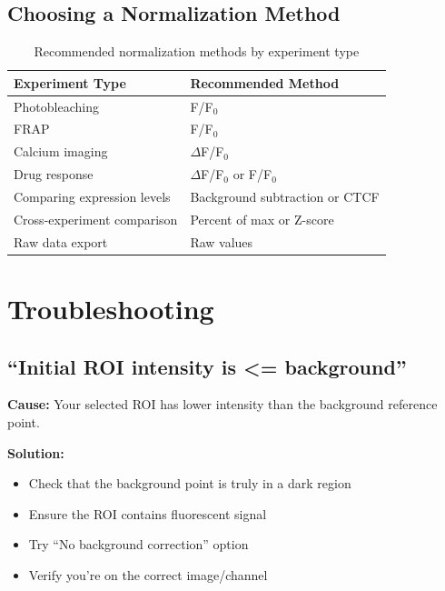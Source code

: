\documentclass[11pt,a4paper]{article}
\begin{document}
\subsection{Choosing a Normalization Method}

\begin{table}[h]
\centering
\begin{tabular}{@{}ll@{}}
\toprule
\textbf{Experiment Type} & \textbf{Recommended Method} \\
\midrule
Photobleaching & F/F$_0$ \\
FRAP & F/F$_0$ \\
Calcium imaging & $\Delta$F/F$_0$ \\
Drug response & $\Delta$F/F$_0$ or F/F$_0$ \\
Comparing expression levels & Background subtraction or CTCF \\
Cross-experiment comparison & Percent of max or Z-score \\
Raw data export & Raw values \\
\bottomrule
\end{tabular}
\caption{Recommended normalization methods by experiment type}
\end{table}

\section{Troubleshooting}

\subsection{``Initial ROI intensity is <= background''}

\textbf{Cause:} Your selected ROI has lower intensity than the background reference point.

\textbf{Solution:}
\begin{itemize}
    \item Check that the background point is truly in a dark region
    \item Ensure the ROI contains fluorescent signal
    \item Try ``No background correction'' option
    \item Verify you're on the correct image/channel
\end{itemize}
\end{document}
